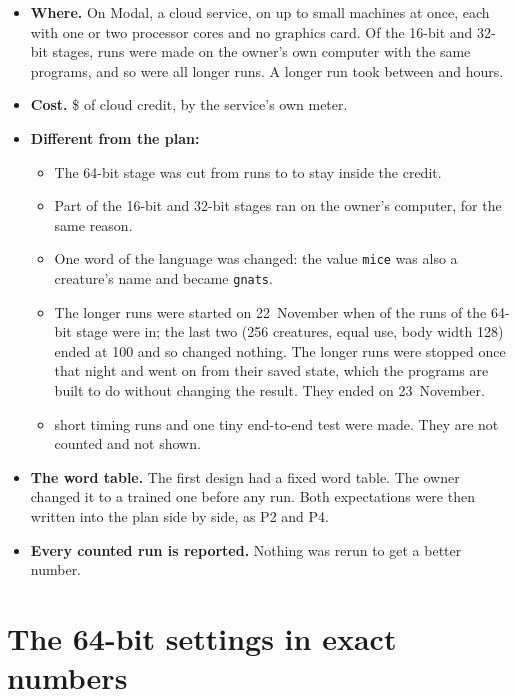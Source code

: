 \documentclass[10pt,letterpaper]{article}
\newcommand{\s}[1]{\texttt{#1}}                  %
\newcommand{\lead}[1]{\textbf{#1}}               %
\begin{document}
\begin{itemize}
\item \lead{Where.} On Modal, a cloud service, on up to \CloudMachines{} small machines at once, each
      with one or two processor cores and no graphics card. Of the 16-bit and 32-bit stages,
      \RunsOnOwnComputer{} runs were made on the owner's own computer with the same programs, and so
      were all \RunsLonger{} longer runs. A longer run took between \LongerHoursLow{} and
      \LongerHoursHigh{} hours.
\item \lead{Cost.} \$\CloudCost{} of cloud credit, by the service's own meter.
\item \lead{Different from the plan:}
  \begin{itemize}
  \item The 64-bit stage was cut from \PlannedSixtyFour{} runs to \RunsSixtyFour{} to stay inside the
        credit.
  \item Part of the 16-bit and 32-bit stages ran on the owner's computer, for the same reason.
  \item One word of the language was changed: the value \s{mice} was also a creature's name and
        became \s{gnats}.
  \item The longer runs were started on 22~November when \LongerStartRunsIn{} of the
        \RunsSixtyFour{} runs of the 64-bit stage were in; the last two (256 creatures, equal use,
        body width 128) ended at 100 and so changed nothing. The longer runs were stopped once that
        night and went on from their saved state, which the programs are built to do without
        changing the result. They ended on 23~November.
  \item \TimingRuns{} short timing runs and one tiny end-to-end test were made. They are not
        counted and not shown.
  \end{itemize}
\item \lead{The word table.} The first design had a fixed word table. The owner changed it to a
      trained one before any run. Both expectations were then written into the plan side by side,
      as P2 and P4.
\item \lead{Every counted run is reported.} Nothing was rerun to get a better number.
\end{itemize}

\section{The 64-bit settings in exact numbers}
\end{document}
